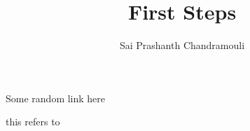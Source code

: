 \documentclass[a4paper,12pt,titlepage]{article} %
\author{Sai Prashanth Chandramouli}
\title{First Steps}
\begin{document}
	\begin{thebibliography}{} %
		Some random link here
	\end{thebibliography}
	
	this refers to \cite{some}
\end{document}
